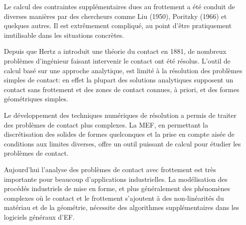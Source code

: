 \begin{histoire}
\medskip
{}

\medskip
Le calcul des contraintes supplémentaires dues au frottement a été conduit de diverses manières 
par des chercheurs comme Liu (1950), 
Poritzky (1966) et quelques autres. 
Il est extrêmement compliqué, au point d'être pratiquement inutilisable dans les situations 
concrètes. 
\end{histoire}

\medskip
Depuis que Hertz a introduit une théorie 
du contact en 1881, de nombreux problèmes  d'ingénieur faisant intervenir le contact ont été résolus. 
L'outil de calcul basé sur une approche analytique, est limité à la résolution des problèmes 
simples de contact: en effet la plupart des solutions analytiques supposent un contact sans frottement 
et des zones de contact connues, à priori, et des formes géométriques simples. 

Le développement des techniques numériques de résolution a permis de traiter des
problèmes de contact plus complexes. 
La MEF, en permettant la discrétisation des solides de formes quelconques et la prise en 
compte aisée de conditions aux limites diverses, offre un outil puissant de calcul pour 
étudier les problèmes de contact.

\medskip
Aujourd'hui l'analyse des problèmes de contact avec frottement est très importante 
pour beaucoup d'applications industrielles. 
La modélisation des procédés industriels de mise en forme, et plus généralement des 
phénomènes complexes où le contact et le frottement s'ajoutent à des non-linéarités 
du matériau et de la géométrie, nécessite des algorithmes supplémentaires dans les 
logiciels généraux d'EF.

